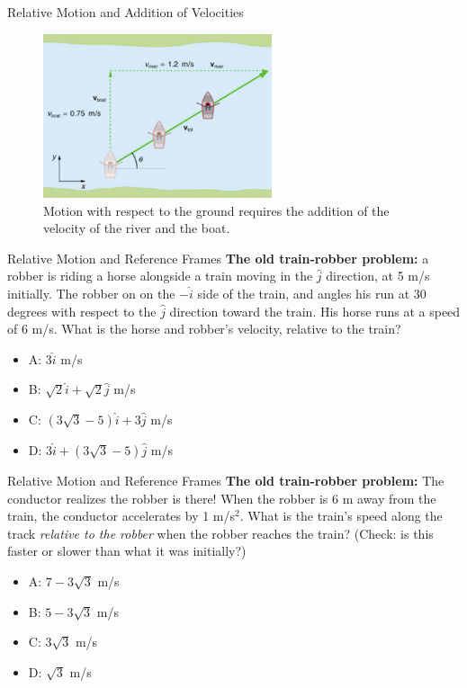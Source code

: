 \documentclass{beamer}
\begin{document}
\begin{frame}{Relative Motion and Addition of Velocities}
\begin{figure}
\includegraphics[width=0.6\textwidth]{figures/relative.png}
\caption{\label{fig:rel} Motion with respect to the ground requires the addition of the velocity of the river and the boat.}
\end{figure}
\end{frame}

\begin{frame}{Relative Motion and Reference Frames}
\small 
\textbf{The old train-robber problem:} a robber is riding a horse alongside a train moving in the $\hat{j}$ direction, at 5 m/s initially.  The robber on on the $-\hat{i}$ side of the train, and angles his run at 30 degrees with respect to the $\hat{j}$ direction toward the train.  His horse runs at a speed of 6 m/s.  What is the horse and robber's velocity, relative to the train?\\
\begin{itemize}
\item A: $3\hat{i}$ m/s
\item B: $\sqrt{2}\hat{i} + \sqrt{2}\hat{j}$ m/s
\item C: $(3\sqrt{3}-5)\hat{i} + 3\hat{j}$  m/s
\item D: $3\hat{i} + (3\sqrt{3}-5)\hat{j}$  m/s
\end{itemize}
\end{frame}

\begin{frame}{Relative Motion and Reference Frames}
\small 
\textbf{The old train-robber problem:} The conductor realizes the robber is there!  When the robber is 6 m away from the train, the conductor accelerates by 1 m/s$^2$.  What is the train's speed along the track \textit{relative to the robber} when the robber reaches the train? (Check: is this faster or slower than what it was initially?)\\
\begin{itemize}
\item A: $7-3\sqrt{3}$ m/s
\item B: $5-3\sqrt{3}$ m/s
\item C: $3\sqrt{3}$  m/s
\item D: $\sqrt{3}$  m/s
\end{itemize}
\end{frame}
\end{document}
